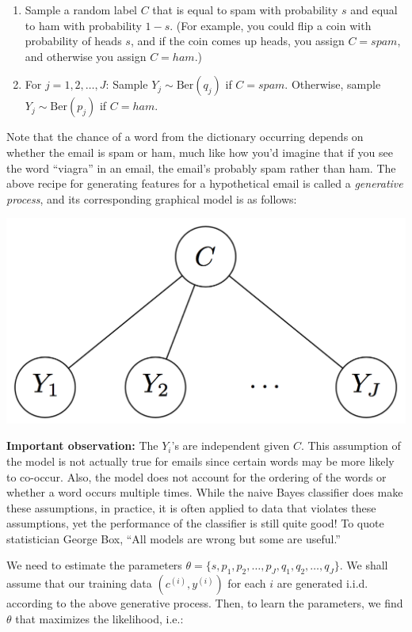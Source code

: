 \begin{enumerate}
\item Sample a random label $C$ that is equal to spam with probability $s$ and equal to ham with probability $1-s$. (For example, you could flip a coin with probability of heads $s$, and if the coin comes up heads, you assign $C=spam$, and otherwise you assign $C=ham$.)

\item For $j=1,2, \dots ,J$: Sample $Y_{j}\sim \text {Ber}(q_{j})$ if $C=spam$. Otherwise, sample $Y_{j}\sim \text {Ber}(p_{j})$ if $C=ham$.
\end{enumerate}

Note that the chance of a word from the dictionary occurring depends on whether the email is spam or ham, much like how you'd imagine that if you see the word ``viagra'' in an email, the email's probably spam rather than ham. The above recipe for generating features for a hypothetical email is called a \textit{generative process}, and its corresponding graphical model is as follows:

{\centering\includegraphics[scale=0.4]{images_naive-bayes} \par}

\textbf{Important observation:} The $Y_i$'s are independent given $C$. This assumption of the model is not actually true for emails since certain words may be more likely to co-occur. Also, the model does not account for the ordering of the words or whether a word occurs multiple times. While the naive Bayes classifier does make these assumptions, in practice, it is often applied to data that violates these assumptions, yet the performance of the classifier is still quite good! To quote statistician George Box, ``All models are wrong but some are useful.''

We need to estimate the parameters $\theta =\{ s,p_{1},p_{2},\dots ,p_{J},q_{1},q_{2},\dots ,q_{J}\}$. We shall assume that our training data $(c^{(i)},y^{(i)})$ for each $i$ are generated i.i.d. according to the above generative process. Then, to learn the parameters, we find $\theta$ that maximizes the likelihood, i.e.:

